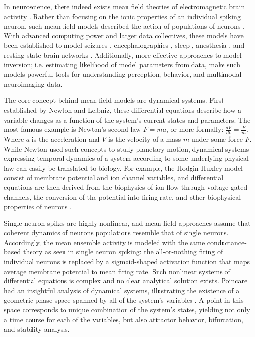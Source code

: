 In neuroscience, there indeed exists mean field theories of electromagnetic brain activity \cite{PhysRevLett.77.960}. Rather than focusing on the ionic properties of an individual spiking neuron, such mean field models described the action of populations of neurons \cite{freeman_mass_1975}. With advanced computing power and larger data collectives, these models have been established to model seizures \cite{breakspear2006unifying}, encephalographies \cite{bojak2015emergence}, sleep \cite{phillips2007quantitative}, anesthesia \cite{bojak2005modeling}, and resting-state brain networks \cite{Honey2007,Deco2009}. Additionally, more effective approaches to model inversion; i.e. estimating likelihood of model parameters from data, make such models powerful tools for understanding perception, behavior, and multimodal neuroimaging data. 

The core concept behind mean field models are dynamical systems. First established by Newton and Leibniz, these differential equations describe how a variable changes as a function of the system's current states and parameters. The most famous example is Newton's second law $F = ma$, or more formally: $\frac{dV}{dt} = \frac{F}{m}$. Where $a$ is the acceleration and $V$ is the velocity of a mass $m$ under some force $F$. While Newton used such concepts to study planetary motion, dynamical systems expressing temporal dynamics of a system according to some underlying physical law can easily be translated to biology. For example, the Hodgin-Huxley model consist of membrane potential and ion channel variables, and differential equations are then derived from the biophysics of ion flow through voltage-gated channels, the conversion of the potential into firing rate, and other biophysical properties of neurons \cite{hodgkin_quantitative_1952,Wilson1972}. 

Single neuron spikes are highly nonlinear, and mean field approaches assume that coherent dynamics of neurons populations resemble that of single neurons. Accordingly, the mean ensemble activity is modeled with the same conductance-based theory as seen in single neuron spiking: the all-or-nothing firing of individual neurons is replaced by a sigmoid-shaped activation function that maps average membrane potential to mean firing rate. Such nonlinear systems of differential equations is complex and no clear analytical solution exists. Poincare had an insightful analysis of dynamical systems, illustrating the existence of a geometric phase space spanned by all of the system's variables \cite{poincare1899methodes}. A point in this space corresponds to unique combination of the system's states, yielding not only a time course for each of the variables, but also attractor behavior, bifurcation, and stability analysis. 

